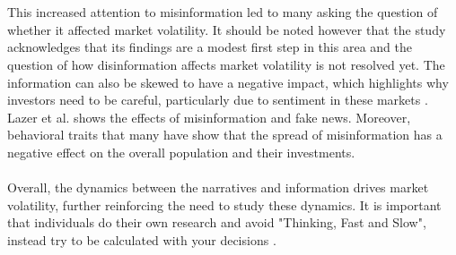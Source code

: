 \documentclass{article}
\begin{document}
\\\\
This increased attention to misinformation led to many asking the question of whether it affected market volatility. It should be noted however that the study acknowledges that its findings are a modest first step in this area and the question of how disinformation affects market volatility is not resolved yet. The information can also be skewed to have a negative impact, which highlights why investors need to be careful, particularly due to sentiment in these markets \cite{source45}. Lazer et al. \cite{source44} shows the effects of misinformation and fake news. Moreover, behavioral traits that many have show that the spread of misinformation has a negative effect on the overall population and their investments.
\\\\
Overall, the dynamics between the narratives and information drives market volatility, further reinforcing the need to study these dynamics. It is important that individuals do their own research and avoid "Thinking, Fast and Slow", instead try to be calculated with your decisions \cite{source38}. 
\end{document}
